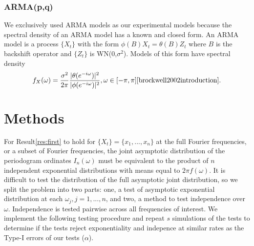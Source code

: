 \documentclass{article}\usepackage{graphicx, color}
\newcommand{\mj}[1]{{\color{blue} #1}}
\theoremstyle{plain}
\begin{document}
\subsubsection*{ARMA(p,q)}
We exclusively used ARMA models as our experimental models because the spectral density of an ARMA model has a known and closed form. An ARMA model is a process $\{X_t\}$ with the form $\phi(B)X_t = \theta(B)Z_t$ where $B$ is the backshift operator and $\{Z_t\}$ is WN(0,$\sigma^2$). Models of this form have spectral density
\begin{align}
f_X(\omega) = \frac{\sigma^2}{2\pi} \frac{|\theta(e^{-i \omega})|^2}{|\phi(e^{-i \omega})|^2}, \omega \in [-\pi, \pi] \text{\cite{brockwell2002introduction}}.
\end{align}



\section{Methods}


For Result\ref{res:first} to hold for $\{X_t\}=\{x_1,...,x_n\}$ at the full Fourier frequencies, or a subset of Fourier frequencies, the joint asymptotic distribution of the periodogram ordinates $I_n(\omega)$ must be equivalent to the product of $n$ independent exponential distributions with means equal to $2\pi f(\omega)$. It is difficult to test the distribution of the full asymptotic joint distribution, so we split the problem into two parts: one, a test of asymptotic exponential distribution at each $\omega_j, j=1,...,n$, and two, a method to test independence over $\omega$. Independence is tested pairwise across all frequencies of interest. We implement the following testing procedure and repeat $s$ simulations of the tests to determine if the tests reject exponentiality and indepence at similar rates as the Type-I errors of our tests ($\alpha$).
\end{document}
